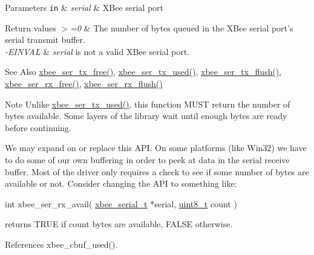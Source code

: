 \begin{DoxyParams}[1]{Parameters}
\mbox{\tt in}  & {\em serial} & X\-Bee serial port\\
\hline
\end{DoxyParams}

\begin{DoxyRetVals}{Return values}
{\em $>$=0} & The number of bytes queued in the X\-Bee serial port's serial transmit buffer. \\
\hline
{\em -\/\-E\-I\-N\-V\-A\-L} & {\itshape serial} is not a valid X\-Bee serial port.\\
\hline
\end{DoxyRetVals}
\begin{DoxySeeAlso}{See Also}
\hyperlink{group__hal__dos_ga3ad8f378b572d6fec982f1086bd3b94f}{xbee\-\_\-ser\-\_\-tx\-\_\-free()}, \hyperlink{group__hal__dos_gaabf70934d186354cde4ac14ed27d1bd2}{xbee\-\_\-ser\-\_\-tx\-\_\-used()}, \hyperlink{group__hal__dos_ga05308d37301d27715f1e1308b7189220}{xbee\-\_\-ser\-\_\-tx\-\_\-flush()}, \hyperlink{group__hal__dos_ga16fb431a1e66861439518e562431821f}{xbee\-\_\-ser\-\_\-rx\-\_\-free()}, \hyperlink{group__hal__dos_ga98a6d5ceb5e1445e8ef82ccaa65a8c15}{xbee\-\_\-ser\-\_\-rx\-\_\-flush()}
\end{DoxySeeAlso}
\begin{DoxyNote}{Note}
Unlike \hyperlink{group__hal__dos_gaabf70934d186354cde4ac14ed27d1bd2}{xbee\-\_\-ser\-\_\-tx\-\_\-used()}, this function M\-U\-S\-T return the number of bytes available. Some layers of the library wait until enough bytes are ready before continuing.
\end{DoxyNote}
We may expand on or replace this A\-P\-I. On some platforms (like Win32) we have to do some of our own buffering in order to peek at data in the serial receive buffer. Most of the driver only requires a check to see if some number of bytes are available or not. Consider changing the A\-P\-I to something like\-:


\begin{DoxyCode}
\textcolor{keywordtype}{int} xbee\_ser\_rx\_avail( \hyperlink{structxbee__serial__t}{xbee\_serial\_t} *serial, \hyperlink{group__hal_gae1affc9ca37cfb624959c866a73f83c2}{uint8\_t} count
      )
\end{DoxyCode}
 returns T\-R\-U\-E if {\ttfamily count} bytes are available, F\-A\-L\-S\-E otherwise. 

References xbee\-\_\-cbuf\-\_\-used().

